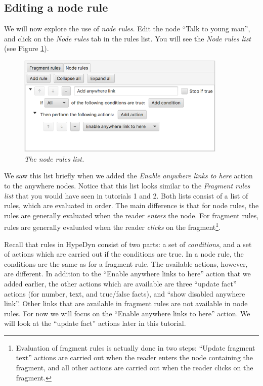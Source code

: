 \documentclass{article}
\begin{document}
\subsection{Editing a node rule}

We will now explore the use of \textit{node rules}. Edit the node ``Talk to young man'', and click on the \textit{Node rules} tab in the rules list. You will see the \textit{Node rules list} (see Figure \ref{fig:tut3:edit_node_rules}).

\begin{figure}[h]
  \centering
  \includegraphics[width=10cm]{images/hypedyn-tutorial-3-figure-4}
  \caption{\textit{The node rules list.}}
  \label{fig:tut3:edit_node_rules}
\end{figure} 

We saw this list briefly when we added the \textit{Enable anywhere links to here} action to the anywhere nodes. Notice that this list looks similar to the \textit{Fragment rules list} that you would have seen in tutorials 1 and 2. Both lists consist of a list of rules, which
are evaluated in order. The main difference is that for node rules, the rules are generally evaluated when the reader \textit{enters} the node. For fragment rules, rules are generally evaluated when the reader \textit{clicks} on the
fragment\footnote{Evaluation of fragment rules is actually done in two steps: ``Update fragment text'' actions are carried out when the reader enters the node containing the fragment, and all other actions are carried out when the reader clicks on the fragment.}.

Recall that rules in HypeDyn consist of two parts: a set of \textit{conditions}, and a set of actions which are carried out if the conditions are true. In a node rule, the conditions are the same as
for a fragment rule. The available actions, however, are different. In addition to the ``Enable anywhere links to here'' action that we added earlier, the other actions which are available are three ``update fact'' actions (for number, text, and true/false facts), and ``show disabled anywhere link''. Other links that are available in fragment rules are not available in node rules. For now we will focus on the ``Enable anywhere links to here'' action. We will look at the ``update fact'' actions later in this tutorial. 
\end{document}
